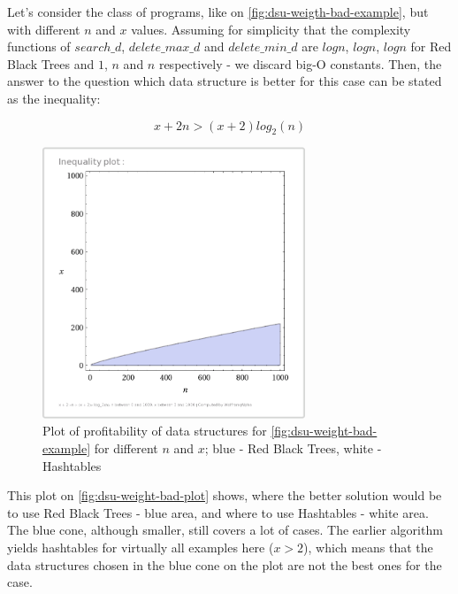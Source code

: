 \documentclass[a4paper,11pt]{article}
\begin{document}
            Let's consider the class of programs, like on \autoref{fig:dsu-weigth-bad-example}, but with different $n$
            and $x$ values. Assuming for simplicity that the complexity functions of $search\_d$, $delete\_max\_d$ and
            $delete\_min\_d$ are $log n$, $log n$, $log n$ for Red Black Trees and $1$, $n$ and $n$ respectively - we
            discard big-O constants. Then, the answer to the question which data structure is better for this case can
            be stated as the inequality:

            \begin{equation}
                x + 2n > (x + 2)log_2(n)
            \end{equation}

            \begin{figure}[!h]
                \begin{center}
                    \includegraphics[width=0.7\textwidth]{thesis-pics/dsu-weight-example.png}
                \end{center}

                \caption{Plot of profitability of data structures for \autoref{fig:dsu-weight-bad-example} for different
                $n$ and $x$; blue - Red Black Trees, white - Hashtables}

                \label{fig:dsu-weight-bad-plot}
            \end{figure}

            This plot on \autoref{fig:dsu-weight-bad-plot} shows, where the better solution would be to use Red Black
            Trees - blue area, and where to use Hashtables - white area. The blue cone, although smaller, still covers a
            lot of cases. The earlier algorithm yields hashtables for virtually all examples here ($x > 2$), which means
            that the data structures chosen in the blue cone on the plot are not the best ones for the case.
\end{document}
